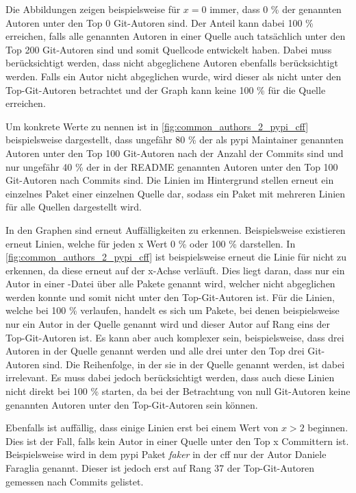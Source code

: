 Die Abbildungen zeigen beispielsweise für $x=0$ immer, dass 0 \% der genannten Autoren unter den Top 0 Git-Autoren sind.
Der Anteil kann dabei 100 \% erreichen, falls alle genannten Autoren in einer Quelle auch tatsächlich unter den Top 200 Git-Autoren sind und somit Quellcode entwickelt haben.
Dabei muss berücksichtigt werden, dass nicht abgeglichene Autoren ebenfalls berücksichtigt werden.
Falls ein Autor nicht abgeglichen wurde, wird dieser als nicht unter den Top-Git-Autoren betrachtet und der Graph kann keine 100 \% für die Quelle erreichen.

Um konkrete Werte zu nennen ist in \autoref{fig:common_authors_2_pypi_cff} beispielsweise dargestellt, dass ungefähr 80 \% der als \gls{pypi} Maintainer genannten Autoren unter den Top 100 Git-Autoren nach der Anzahl der Commits sind und nur ungefähr 40 \% der in der README genannten Autoren unter den Top 100 Git-Autoren nach Commits sind.
Die Linien im Hintergrund stellen erneut ein einzelnes Paket einer einzelnen Quelle dar, sodass ein Paket mit mehreren Linien für alle Quellen dargestellt wird.

In den Graphen sind erneut Auffälligkeiten zu erkennen.
Beispielsweise existieren erneut Linien, welche für jeden x Wert 0 \% oder 100 \% darstellen.
In \autoref{fig:common_authors_2_pypi_cff} ist beispielsweise erneut die Linie für  nicht zu erkennen, da diese erneut auf der x-Achse verläuft.
Dies liegt daran, dass nur ein Autor in einer -Datei über alle Pakete genannt wird, welcher nicht abgeglichen werden konnte und somit nicht unter den Top-Git-Autoren ist.
Für die Linien, welche bei 100 \% verlaufen, handelt es sich um Pakete, bei denen beispielsweise nur ein Autor in der Quelle genannt wird und dieser Autor auf Rang eins der Top-Git-Autoren ist.
Es kann aber auch komplexer sein, beispielsweise, dass drei Autoren in der Quelle genannt werden und alle drei unter den Top drei Git-Autoren sind.
Die Reihenfolge, in der sie in der Quelle genannt werden, ist dabei irrelevant.
Es muss dabei jedoch berücksichtigt werden, dass auch diese Linien nicht direkt bei 100 \% starten, da bei der Betrachtung von null Git-Autoren keine genannten Autoren unter den Top-Git-Autoren sein können.

Ebenfalls ist auffällig, dass einige Linien erst bei einem Wert von $x>2$ beginnen.
Dies ist der Fall, falls kein Autor in einer Quelle unter den Top x Committern ist.
Beispielsweise wird in dem \gls{pypi} Paket \emph{faker} in der \gls{cff} nur der Autor \glqq Daniele Faraglia\grqq{} genannt.
Dieser ist jedoch erst auf Rang 37 der Top-Git-Autoren gemessen nach Commits gelistet.

